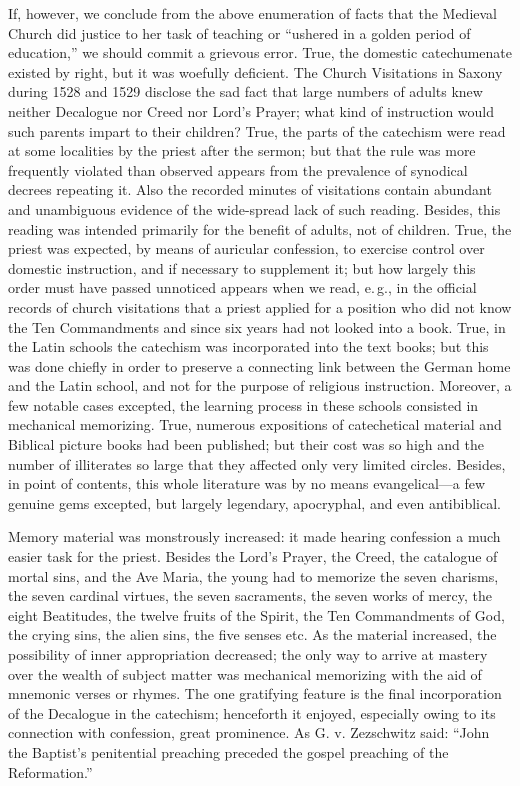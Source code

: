 If, however, we conclude from the above enumeration of facts that the Medieval Church did justice to her task of teaching or “ushered in a golden period of education,” we should commit a grievous error. True, the domestic catechumenate existed by right, but it was woefully deficient. The Church Visitations in Saxony during 1528 and 1529 disclose the sad fact that large numbers of adults knew neither Decalogue nor Creed nor Lord’s Prayer; what kind of instruction would such parents impart to their children? True, the parts of the catechism were read at some localities by the priest after the sermon; but that the rule was more frequently violated than observed appears from the prevalence of synodical decrees repeating it. Also the recorded minutes of visitations contain abundant and unambiguous evidence of the wide-spread lack of such reading. Besides, this reading was intended primarily for the benefit of adults, not of children. True, the priest was expected, by means of auricular confession, to exercise control over domestic instruction, and if necessary to supplement it; but how largely this order must have passed unnoticed appears when we read, e.\,g., in the official records of church visitations that a priest applied for a position who did not know the Ten Commandments and since six years had not looked into a book. True, in the Latin schools the catechism was incorporated into the text books; but this was done chiefly in order to preserve a connecting link between the German home and the Latin school, and not for the purpose of religious instruction. Moreover, a few notable cases excepted, the learning process in these schools consisted in mechanical memorizing. True, numerous expositions of catechetical material and Biblical picture books had been published; but their cost was so high and the number of illiterates so large that they affected only very limited circles. Besides, in point of contents, this whole literature was by no means evangelical—a few genuine
gems excepted, but largely legendary, apocryphal, and even antibiblical.

Memory material was monstrously increased: it made hearing confession a much easier task for the priest. Besides the Lord’s Prayer, the Creed, the catalogue of mortal sins, and the Ave Maria, the young had to memorize the seven charisms, the seven cardinal virtues, the seven sacraments, the seven works of mercy, the eight Beatitudes, the twelve fruits of the Spirit, the Ten Commandments of God, the crying sins, the alien sins, the five senses etc. As the material increased, the possibility of inner appropriation decreased; the only way to arrive at mastery over the wealth of subject matter was mechanical memorizing with the aid of mnemonic verses or rhymes. The one gratifying feature is the final incorporation of the Decalogue in the catechism; henceforth it enjoyed, especially owing to its connection with confession, great prominence. As G. v. Zezschwitz said: “John the Baptist’s penitential preaching preceded the gospel preaching of the Reformation.”

